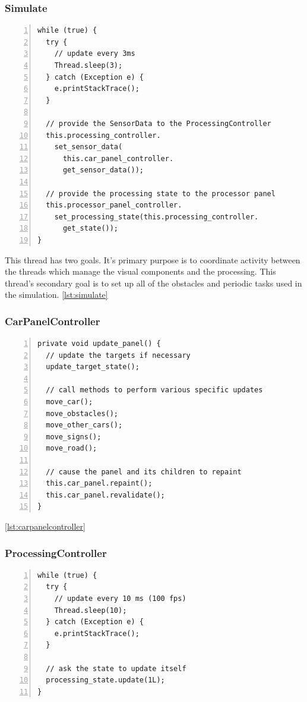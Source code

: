 \documentclass{article} %
\begin{document}
\subsubsection{Simulate}
\begin{lstlisting}[caption={Simulate Update Procedure},label={lst:simulate},numbers=left]
while (true) {
  try {
    // update every 3ms
    Thread.sleep(3);
  } catch (Exception e) {
    e.printStackTrace();
  }

  // provide the SensorData to the ProcessingController
  this.processing_controller.
    set_sensor_data(
      this.car_panel_controller.
      get_sensor_data());

  // provide the processing state to the processor panel
  this.processor_panel_controller.
    set_processing_state(this.processing_controller.
      get_state());
}
\end{lstlisting}


This thread has two goals. It's primary purpose is to coordinate activity between the threads which manage the visual components and the processing.
This thread's secondary goal is to set up all of the obstacles and periodic tasks used in the simulation.
\ref{lst:simulate}

\subsubsection{CarPanelController}
\begin{lstlisting}[caption={Panel Update Procedure},label={lst:carpanelcontroller},numbers=left]
private void update_panel() {
  // update the targets if necessary
  update_target_state();

  // call methods to perform various specific updates
  move_car();
  move_obstacles();
  move_other_cars();
  move_signs();
  move_road();

  // cause the panel and its children to repaint
  this.car_panel.repaint();
  this.car_panel.revalidate();
}
\end{lstlisting}

\ref{lst:carpanelcontroller}

\subsubsection{ProcessingController}
\begin{lstlisting}[caption={Processing Controller Update Procedure},label={lst:ProcessingController},numbers=left]
while (true) {
  try {
    // update every 10 ms (100 fps)
    Thread.sleep(10);
  } catch (Exception e) {
    e.printStackTrace();
  }

  // ask the state to update itself
  processing_state.update(1L);
}
\end{lstlisting}
\end{document}
